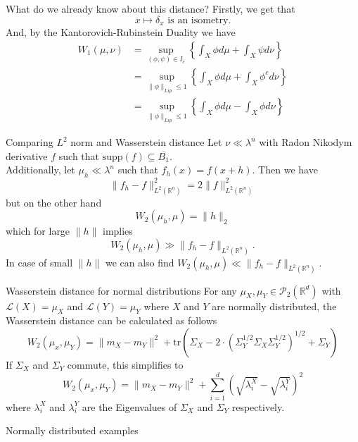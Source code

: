 \documentclass[10pt]{beamer}
\begin{document}
\begin{frame}{What do we already know about this distance?}
    Firstly, we get that $$x \mapsto \delta_x \text{ is an isometry.}$$ 
    And, by the Kantorovich-Rubinstein Duality we have \begin{align*} W_1(\mu,\nu) &= \sup_{(\phi,\psi) \in I_c} \left\{ \int_X \phi d\mu + \int_X \psi d\nu \right\} \\ &= \sup_{\|\phi\|_{Lip} \leq 1} \left\{\int_X \phi d\mu + \int_X \phi^c d\nu  \right\} 
       \\ &= \sup_{\|\phi\|_{Lip} \leq 1} \left\{\int_X \phi d\mu - \int_X \phi d\nu  \right\} \end{align*}
\end{frame}


\begin{frame}{Comparing $L^2$ norm and Wasserstein distance}
    Let $\nu \ll \lambda^n$ with Radon Nikodym derivative $f$ such that $\text{supp}(f) \subseteq \overline{B_1}$. \\ 
    \vspace{0.5cm}
        Additionally, let $\mu_h \ll \lambda^n$ such that $f_h(x) = f(x+h)$. Then we have $$\|f_h-f\|^2_{L^2(\mathbb{R}^n)} = 2\|f\|_{L^2(\mathbb{R}^n)}^2$$ but on the other hand $$W_2(\mu_h,\mu) = \|h\|_2$$ which for large $\|h\|$ implies $$W_2(\mu_h,\mu) \gg \|f_h-f\|_{L^2(\mathbb{R}^n)}.$$ In case of small $\|h\|$ we can also find $W_2(\mu_h,\mu) \ll \|f_h-f\|_{L^2(\mathbb{R}^n)}$.
\end{frame}

\begin{frame}{Wasserstein distance for normal distributions}
    For any $\mu_X,\mu_Y \in \mathcal{P}_2(\mathbb{R}^d)$ with $\mathcal{L}(X) = \mu_X$ and $\mathcal{L}(Y) = \mu_Y$ where $X$ and $Y$ are normally distributed, 
    the Wasserstein distance can be calculated as follows $$W_2(\mu_x,\mu_Y) = \|m_X-m_Y\|^2 + \text{tr}\left(\Sigma_X-2 \cdot \left(\Sigma_Y^{1/2}\Sigma_X\Sigma_Y^{1/2}\right)^{1/2}+\Sigma_Y\right)$$
    If $\Sigma_X$ and $\Sigma_Y$ commute, this simplifies to $$W_2(\mu_x,\mu_Y) = \|m_X-m_Y\|^2 + \sum_{i = 1}^d \left( \sqrt{\lambda_i^X} - \sqrt{\lambda_i^Y}  \right)^2$$
    where $\lambda_i^X$ and $\lambda_i^Y$ are the Eigenvalues of $\Sigma_X$ and $\Sigma_Y$ respectively. 
\end{frame}

\begin{frame}{Normally distributed examples}
    
    

\end{frame}
\end{document}
